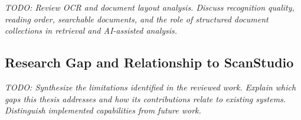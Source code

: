 \documentclass{article}
\begin{document}
\textit{TODO: Review OCR and document layout analysis. Discuss recognition
quality, reading order, searchable documents, and the role of structured
document collections in retrieval and AI-assisted analysis.}

\subsection{Research Gap and Relationship to ScanStudio}
\label{sec:rw-research-gap}

\textit{TODO: Synthesize the limitations identified in the reviewed work.
Explain which gaps this thesis addresses and how its contributions relate to
existing systems. Distinguish implemented capabilities from future work.}

% 
% 

\end{document}
